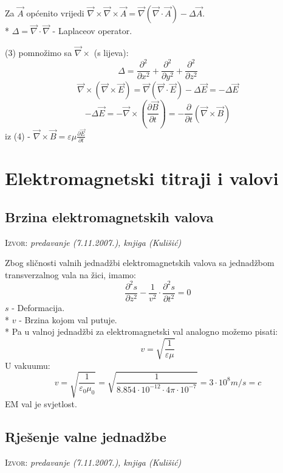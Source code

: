 \documentclass{report}
\begin{document}
{\noindent Za $\vec A$ općenito vrijedi $\vec \nabla \times \vec \nabla \times \vec A = \vec \nabla (\vec \nabla \cdot \vec A) - \Delta \vec{A}$.\\*
$\Delta = \vec \nabla \cdot \vec \nabla$ - Laplaceov operator.

($3$) pomnožimo sa $\vec \nabla \times $ (s lijeva):
$$\Delta = \frac{\partial ^2}{\partial x^2} + \frac{\partial ^2}{\partial y^2} + \frac{\partial ^2}{\partial z^2}$$
$$\vec \nabla \times (\vec \nabla \times \vec E) = \vec \nabla (\vec \nabla \cdot \vec E) - \Delta \vec E = - \Delta \vec E$$
$$- \Delta \vec E = - \vec \nabla \times \left ( \frac{\partial \vec B}{\partial t} \right ) = - \frac{\partial}{\partial t} (\vec \nabla \times \vec B)$$
iz (4) - $\vec \nabla \times \vec B = \varepsilon \mu \frac{\partial \vec E}{\partial t}$
\begin{center}
\end{center}
\begin{center}
\end{center}

\chapter{Elektromagnetski titraji i valovi}

\section{Brzina elektromagnetskih valova}
\small \textsc{Izvor:} \textit{predavanje (7.11.2007.), knjiga (Kulišić)}

Zbog sličnosti valnih jednadžbi elektromagnetskih valova sa jednadžbom transverzalnog vala na žici, imamo:
$$ \dfrac{\partial ^2 s}{\partial z^2} - \dfrac{1}{v^2} \cdot \dfrac{\partial ^2 s}{\partial t^2} = 0$$
$s$ - Deformacija.\\*
$v$ - Brzina kojom val putuje.\\*
Pa u valnoj jednadžbi za elektromagnetski val analogno možemo pisati:
$$v = \sqrt{\dfrac{1}{\varepsilon \mu}}$$
U vakuumu:
$$v = \sqrt{\frac{1}{\varepsilon_0 \mu_0}} = \sqrt{\frac{1}{8.854 \cdot 10^{-12} \cdot 4\pi \cdot 10^{-7}}} = 3 \cdot 10^8 m/s = c$$
EM val je svjetlost.

\section{Rješenje valne jednadžbe}
\small \textsc{Izvor:} \textit{predavanje (7.11.2007.), knjiga (Kulišić)}

}
\end{document}
